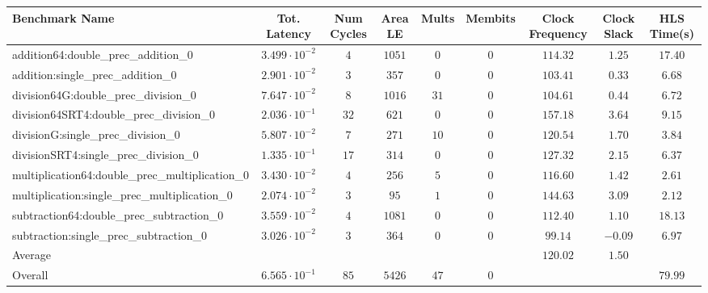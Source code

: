 \begin{tabular}{|l|c|c|c|c|c|c|c|c|}
\hline
Benchmark Name                                   & Tot. Latency            & Num Cycles & Area LE  & Mults  & Membits & Clock Frequency & Clock Slack & HLS Time(s) \\
\hline
addition64:double\_prec\_addition\_0             & $ 3.499 \cdot 10^{-2} $ & $ 4      $ & $ 1051 $ & $ 0  $ & $ 0   $ & $ 114.32      $ & $ 1.25    $ & $ 17.40   $ \\
addition:single\_prec\_addition\_0               & $ 2.901 \cdot 10^{-2} $ & $ 3      $ & $ 357  $ & $ 0  $ & $ 0   $ & $ 103.41      $ & $ 0.33    $ & $ 6.68    $ \\
division64G:double\_prec\_division\_0            & $ 7.647 \cdot 10^{-2} $ & $ 8      $ & $ 1016 $ & $ 31 $ & $ 0   $ & $ 104.61      $ & $ 0.44    $ & $ 6.72    $ \\
division64SRT4:double\_prec\_division\_0         & $ 2.036 \cdot 10^{-1} $ & $ 32     $ & $ 621  $ & $ 0  $ & $ 0   $ & $ 157.18      $ & $ 3.64    $ & $ 9.15    $ \\
divisionG:single\_prec\_division\_0              & $ 5.807 \cdot 10^{-2} $ & $ 7      $ & $ 271  $ & $ 10 $ & $ 0   $ & $ 120.54      $ & $ 1.70    $ & $ 3.84    $ \\
divisionSRT4:single\_prec\_division\_0           & $ 1.335 \cdot 10^{-1} $ & $ 17     $ & $ 314  $ & $ 0  $ & $ 0   $ & $ 127.32      $ & $ 2.15    $ & $ 6.37    $ \\
multiplication64:double\_prec\_multiplication\_0 & $ 3.430 \cdot 10^{-2} $ & $ 4      $ & $ 256  $ & $ 5  $ & $ 0   $ & $ 116.60      $ & $ 1.42    $ & $ 2.61    $ \\
multiplication:single\_prec\_multiplication\_0   & $ 2.074 \cdot 10^{-2} $ & $ 3      $ & $ 95   $ & $ 1  $ & $ 0   $ & $ 144.63      $ & $ 3.09    $ & $ 2.12    $ \\
subtraction64:double\_prec\_subtraction\_0       & $ 3.559 \cdot 10^{-2} $ & $ 4      $ & $ 1081 $ & $ 0  $ & $ 0   $ & $ 112.40      $ & $ 1.10    $ & $ 18.13   $ \\
subtraction:single\_prec\_subtraction\_0         & $ 3.026 \cdot 10^{-2} $ & $ 3      $ & $ 364  $ & $ 0  $ & $ 0   $ & $ 99.14       $ & $ -0.09   $ & $ 6.97    $ \\
\hline
Average                                          & $                     $ & $        $ & $      $ & $    $ & $     $ & $ 120.02      $ & $ 1.50    $ & $         $ \\
\hline
Overall                                          & $ 6.565 \cdot 10^{-1} $ & $ 85     $ & $ 5426 $ & $ 47 $ & $ 0   $ & $             $ & $         $ & $ 79.99   $ \\
\hline
\end{tabular}
